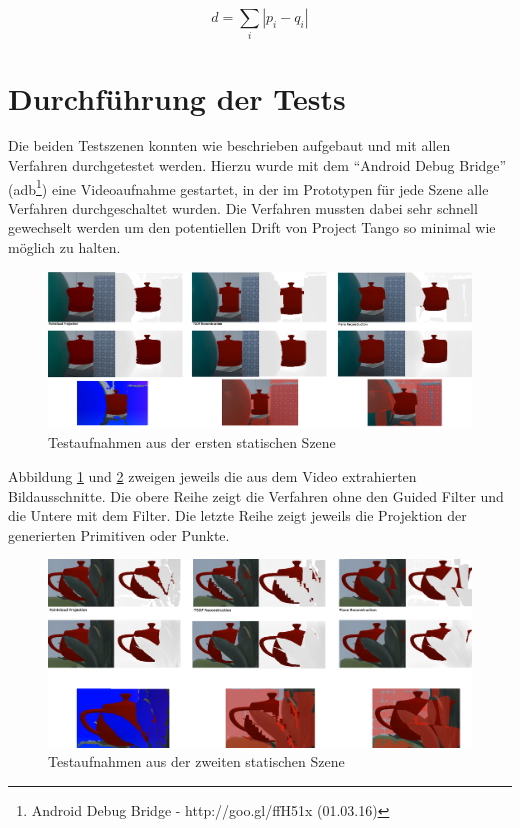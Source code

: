 \begin{equation} \label{eq:diff}
d = \sum_i |p_i-q_i|
\end{equation}

\section{Durchführung der Tests}

Die beiden Testszenen konnten wie beschrieben aufgebaut und mit allen Verfahren durchgetestet werden. Hierzu wurde mit dem \enquote{Android Debug Bridge} (adb\footnote{Android Debug Bridge - http://goo.gl/ffH51x (01.03.16)}) eine Videoaufnahme gestartet, in der im Prototypen für jede Szene alle Verfahren durchgeschaltet wurden. Die Verfahren mussten dabei sehr schnell gewechselt werden um den potentiellen Drift von Project Tango so minimal wie möglich zu halten. 

\begin{figure}[h]
  \centering
	\includegraphics[width=1.0\textwidth]{content/images/evaluation/static_occlusion.png} 
  \caption{Testaufnahmen aus der ersten statischen Szene}
  \label{fig:static_occlusion}
\end{figure}

Abbildung \ref{fig:static_occlusion} und \ref{fig:plant_occlusion} zweigen jeweils die aus dem Video extrahierten Bildausschnitte. Die obere Reihe zeigt die Verfahren ohne den Guided Filter und die Untere mit dem Filter. Die letzte Reihe zeigt jeweils die Projektion der generierten Primitiven oder Punkte.

\begin{figure}[h]
  \centering
	\includegraphics[width=1.0\textwidth]{content/images/evaluation/plant_occlusion.png} 
  \caption{Testaufnahmen aus der zweiten statischen Szene}
  \label{fig:plant_occlusion}
\end{figure}

